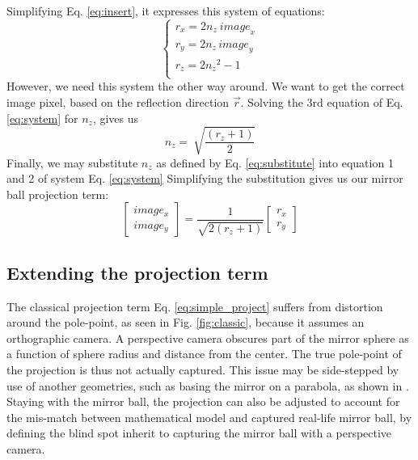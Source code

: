 \documentclass[10pt]{article}
\begin{document}
\begin{multicols}{2}
\begin{equation}
	\end{equation}
	Simplifying Eq. \ref{eq:insert}, it expresses this system of equations:
	\begin{equation}\label{eq:system}
		\left\{\begin{matrix}r_x=2n_z\ {image}_x\\r_y=2n_{z\ }{image}_y\\r_z=2{n_z}^2-1\ \ \ \ \ \\\end{matrix}\right.
	\end{equation}
	However, we need this system the other way around. We want to get the correct image pixel, based on the reflection direction $\vec{r}$. Solving the 3rd equation of Eq. \ref{eq:system} for $n_z$, gives us
	\begin{equation}\label{eq:substitute}
		n_z=\ \sqrt{\frac{\left(r_z+1\right)}{2}}
	\end{equation}
	Finally, we may substitute $n_z$ as defined by Eq. \ref{eq:substitute} into equation 1 and 2 of system Eq. \ref{eq:system} Simplifying the substitution gives us our mirror ball projection term:
	\begin{equation}\label{eq:simple_project}
		\begin{bmatrix} image_x \\ image_y \end{bmatrix}=\frac{1}{\sqrt{2(r_z+1)}}\begin{bmatrix} r_x \\ r_y \end{bmatrix}
	\end{equation}

	\subsection{Extending the projection term}
	The classical projection term Eq. \ref{eq:simple_project} suffers from distortion around the pole-point, as seen in Fig. \ref{fig:classic}, because it assumes an orthographic camera. A perspective camera obscures part of the mirror sphere as a function of sphere radius and distance from the center. The true pole-point of the projection is thus not actually captured. This issue may be side-stepped by use of another geometries, such as basing the mirror on a parabola, as shown in \cite{hyperbolic}. Staying with the mirror ball, the projection can also be adjusted to account for the mis-match between mathematical model and captured real-life mirror ball, by defining the blind spot inherit to capturing the mirror ball with a perspective camera.


\end{multicols}
\end{document}
